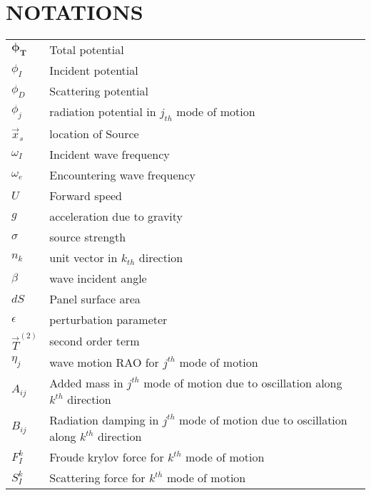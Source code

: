 \chapter*{\centering NOTATIONS}
\vspace{0.5cm}
\begin{table}[h]
\centering
\setlength{\tabcolsep}{12pt}
\renewcommand{\arraystretch}{1.5} %
\begin{tabular}{ll}
    $\boldsymbol{\phi_T}$   &    Total potential \\
    $\phi_I$ & Incident potential \\
    $\phi_D$ & Scattering potential \\
    $\phi_j$ & radiation potential in $j_{th}$ mode of motion \\
    $\vec{x}_s$ & location of Source \\
    $\omega_I$ & Incident wave frequency \\
    $\omega_e$ & Encountering wave frequency \\
    $U$ & Forward speed \\
    $g$ & acceleration due to gravity \\
    $\sigma$ & source strength \\
    $n_k$ & unit vector in $k_{th}$ direction \\
    $\beta$ & wave incident angle \\
    $dS$  & Panel surface area \\
    $\epsilon$ & perturbation parameter \\
    $\vec{T}^{(2)}$ & second order term \\
    $\eta_j$ & wave motion RAO for $j^{th}$ mode of motion \\
    $A_{ij}$ & Added mass in $j^{th}$ mode of motion due to oscillation along $k^{th}$ direction \\
    $B_{ij}$ & Radiation damping in $j^{th}$ mode of motion due to oscillation along $k^{th}$ direction \\
    $F_I^k$ & Froude krylov force for $k^{th}$ mode of motion \\
    $S_I^k$ & Scattering force for $k^{th}$ mode of motion 
\end{tabular}
\end{table}